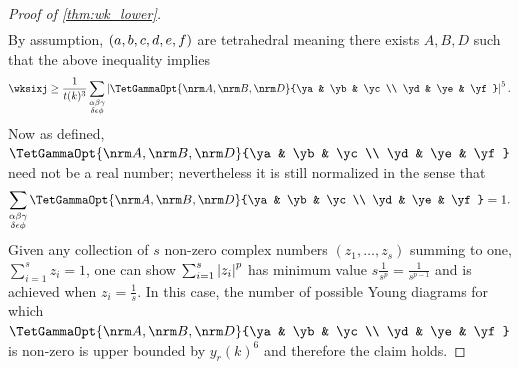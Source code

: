 \documentclass[notitlepage, 10pt]{article}
\begin{document}
\begin{proof}[Proof of \cref{thm:wk_lower}]
\begin{align}
    \end{align}
    By assumption, $(a,b,c,d,e,f)$ are tetrahedral meaning there exists $A,B,D$ such that the above inequality implies
    \begin{equation}
        \wksixj \geq \frac{1}{t(k)^3}\sum_{\substack{\ya\yb\yc\\\yd\ye\yf}}\abs{\TetGammaOpt{\nrm A,\nrm B,\nrm D}{\ya & \yb & \yc \\ \yd & \ye & \yf}}^5.
    \end{equation}
    Now as defined, $\TetGammaOpt{\nrm A,\nrm B,\nrm D}{\ya & \yb & \yc \\ \yd & \ye & \yf}$ need not be a real number;
    nevertheless it is still normalized in the sense that
    \begin{equation}
        \sum_{\substack{\ya\yb\yc\\\yd\ye\yf}}\TetGammaOpt{\nrm A,\nrm B,\nrm D}{\ya & \yb & \yc \\ \yd & \ye & \yf} = 1.
    \end{equation}
    Given any collection of $s$ non-zero complex numbers $(z_1, \ldots, z_s)$ summing to one, $\sum_{i=1}^{s}z_i = 1$, one can show $\sum_{i=1}^{s}\left|z_i\right|^p$ has minimum value $s \frac{1}{s^p} = \frac{1}{s^{p-1}}$ and is achieved when $z_i=\frac{1}{s}$.
    In this case, the number of possible Young diagrams for which $\TetGammaOpt{\nrm A,\nrm B,\nrm D}{\ya & \yb & \yc \\ \yd & \ye & \yf}$ is non-zero is upper bounded by $y_{r}(k)^6$ and therefore the claim holds.
\end{proof}
\end{document}

